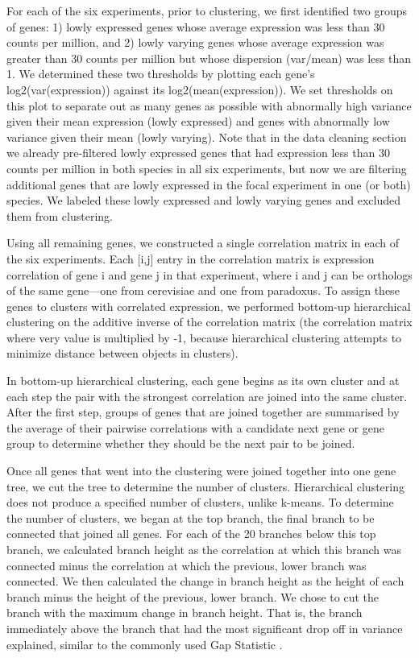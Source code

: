 For each of the six experiments, prior to clustering, we first identified two groups of genes: 1) lowly expressed genes whose average expression was less than 30 counts per million, and 2) lowly varying genes whose average expression was greater than 30 counts per million but whose dispersion (var/mean) was less than 1. We determined these two thresholds by plotting each gene's log2(var(expression)) against its log2(mean(expression)). We set thresholds on this plot to separate out as many genes as possible with abnormally high variance given their mean expression (lowly expressed) and genes with abnormally low variance given their mean (lowly varying). Note that in the data cleaning section we already pre-filtered lowly expressed genes that had expression less than 30 counts per million in both species in all six experiments, but now we are filtering additional genes that are lowly expressed in the focal experiment in one (or both) species. We labeled these lowly expressed and lowly varying genes and excluded them from clustering.

Using all remaining genes, we constructed a single correlation matrix in each of the six experiments. Each [i,j] entry in the correlation matrix is expression correlation of gene i and gene j in that experiment, where i and j can be orthologs of the same gene---one from cerevisiae and one from paradoxus. To assign these genes to clusters with correlated expression, we performed bottom-up hierarchical clustering on the additive inverse of the correlation matrix (the correlation matrix where very value is multiplied by -1, because hierarchical clustering attempts to minimize distance between objects in clusters). 

In bottom-up hierarchical clustering, each gene begins as its own cluster and at each step the pair with the strongest correlation are joined into the same cluster. After the first step, groups of genes that are joined together are summarised by the average of their pairwise correlations with a candidate next gene or gene group to determine whether they should be the next pair to be joined.

Once all genes that went into the clustering were joined together into one gene tree, we cut the tree to determine the number of clusters. Hierarchical clustering does not produce a specified number of clusters, unlike k-means. To determine the number of clusters, we began at the top branch, the final branch to be connected that joined all genes. For each of the 20 branches below this top branch, we calculated branch height as the correlation at which this branch was connected minus the correlation at which the previous, lower branch was connected. We then calculated the change in branch height as the height of each branch minus the height of the previous, lower branch. We chose to cut the branch with the maximum change in branch height. That is, the branch immediately above the branch that had the most significant drop off in variance explained, similar to the commonly used Gap Statistic \cite{Tibshirani2001}.

